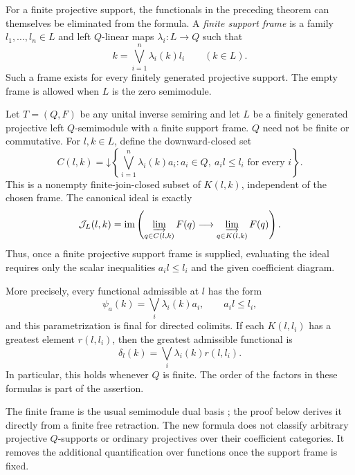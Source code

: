 For a finite projective support, the functionals in the preceding theorem
can themselves be eliminated from the formula. A \emph{finite support
frame} is a family $l_1,\ldots,l_n\in L$ and left $Q$-linear maps
$\lambda_i:L\to Q$ such that
\begin{equation}\label{eq:support-frame}
 k=\bigvee_{i=1}^n\lambda_i(k)l_i\qquad(k\in L).
\end{equation}
Such a frame exists for every finitely generated projective support.
The empty frame is allowed when $L$ is the zero semimodule.

\begin{theorem}
\label{thm:finite-frame-ideal}
Let $T=(Q,F)$ be any unital inverse semiring and let $L$ be a finitely
generated projective left $Q$-semimodule with a finite support frame.
$Q$ need not be finite or commutative.
For $l,k\in L$, define the downward-closed set
\begin{equation}\label{eq:frame-C}
 C(l,k)=\mathord\downarrow\left\{
  \bigvee_{i=1}^n\lambda_i(k)a_i:
  a_i\in Q,\ a_i l\leq l_i\text{ for every }i\right\}.
\end{equation}
This is a nonempty finite-join-closed subset of $K(l,k)$, independent of
the chosen frame. The canonical ideal is exactly
\begin{equation}\label{eq:frame-J}
 \mathcal J_L(l,k)=\operatorname{im}\left(
  \varinjlim_{q\in C(l,k)}F(q)
  \longrightarrow\varinjlim_{q\in K(l,k)}F(q)\right).
\end{equation}
Thus, once a finite projective support frame is supplied, evaluating
the ideal requires only the scalar inequalities $a_i l\leq l_i$ and the
given coefficient diagram.

More precisely, every functional admissible at $l$ has the form
\[
 \psi_a(k)=\bigvee_i\lambda_i(k)a_i,
 \qquad a_i l\leq l_i,
\]
and this parametrization is final for directed colimits. If each
$K(l,l_i)$ has a greatest element $r(l,l_i)$, then the greatest
admissible functional is
\begin{equation}\label{eq:frame-delta}
 \delta_l(k)=\bigvee_i\lambda_i(k)r(l,l_i).
\end{equation}
In particular, this holds whenever $Q$ is finite. The order of the
factors in these formulas is part of the assertion.
\end{theorem}

The finite frame is the usual semimodule dual basis
\cite[Dual Basis Lemma, pp.~161--163]{DeorePatil}; the proof below derives
it directly from a finite free retraction. The new formula does not
classify arbitrary projective $Q$-supports or ordinary projectives over
their coefficient categories. It removes the additional quantification
over functions once the support frame is fixed.
